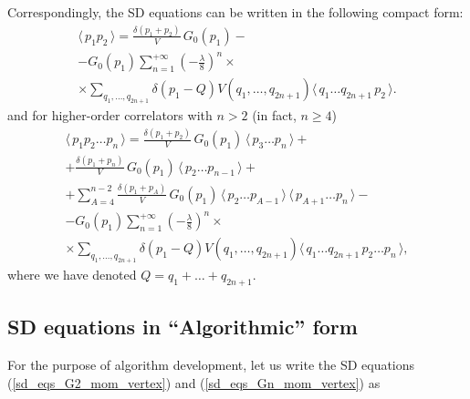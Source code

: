 \documentclass[12pt]{article}
\newcommand{\lr}[1]{ \left( #1 \right) }
\newcommand{\vev}[1]{ \langle \, #1 \, \rangle }
\begin{document}
Correspondingly, the SD equations can be written in the following compact form:
\begin{eqnarray}
\label{sd_eqs_G2_mom_vertex}
 \vev{p_1 p_2} = \frac{\delta\lr{p_1 + p_2}}{V} \, G_0\lr{p_1}
 - \nonumber \\ -
 G_0\lr{p_1} \sum\limits_{n=1}^{+\infty}
 \lr{-\frac{\lambda}{8}}^n
 \times \nonumber \\ \times
 \sum\limits_{q_1, \ldots, q_{2 n + 1}}
 \delta\lr{p_1 - Q}
 V\lr{q_1, \ldots, q_{2 n + 1}}
 \vev{q_1 \ldots q_{2 n + 1} \, p_2} .
\end{eqnarray}
and for higher-order correlators with $n > 2$ (in fact, $n \geq 4$)
\begin{eqnarray}
\label{sd_eqs_Gn_mom_vertex}
 \vev{p_1 p_2 \ldots p_n}
 =
 \frac{\delta\lr{p_1 + p_2}}{V} \, G_0\lr{p_1} \, \vev{p_3 \ldots p_n}
 + \nonumber \\ +
 \frac{\delta\lr{p_1 + p_n}}{V} \, G_0\lr{p_1} \, \vev{p_2 \ldots p_{n-1}}
 + \nonumber \\ +
 \sum\limits_{A=4}^{n-2}
 \frac{\delta\lr{p_1 + p_A}}{V} \, G_0\lr{p_1} \,
 \vev{p_2 \ldots p_{A-1}} \, \vev{p_{A+1} \ldots p_n}
 - \nonumber \\ -
 G_0\lr{p_1} \sum\limits_{n=1}^{+\infty}
 \lr{-\frac{\lambda}{8}}^n
 \times \nonumber \\ \times
 \sum\limits_{q_1, \ldots, q_{2 n + 1}}
 \delta\lr{p_1 - Q}
 V\lr{q_1, \ldots, q_{2 n + 1}}
 \vev{q_1 \ldots q_{2 n + 1} \, p_2  \ldots p_n} ,
\end{eqnarray}
where we have denoted $Q = q_1 + \ldots + q_{2 n + 1}$.

\subsection{SD equations in ``Algorithmic'' form}
\label{subsec:sds_algorithmic}

 For the purpose of algorithm development, let us write the SD equations (\ref{sd_eqs_G2_mom_vertex}) and (\ref{sd_eqs_Gn_mom_vertex}) as
\end{document}
